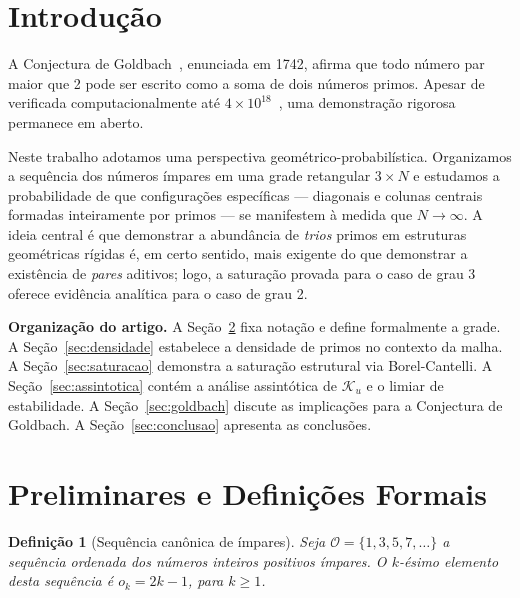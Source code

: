 \documentclass{article}
\newtheorem{definition}[proposition]{Definição}
\begin{document}
	\section{Introdução}
	
	A Conjectura de Goldbach~\cite{goldbach1742}, enunciada em 1742,
	afirma que todo número par maior que 2 pode ser escrito como a
	soma de dois números primos. Apesar de verificada computacionalmente
	até $4 \times 10^{18}$~\cite{oliveira2014}, uma demonstração
	rigorosa permanece em aberto.
	
	Neste trabalho adotamos uma perspectiva geométrico-probabilística.
	Organizamos a sequência dos números ímpares em uma grade retangular
	$3 \times N$ e estudamos a probabilidade de que configurações
	específicas — diagonais e colunas centrais formadas inteiramente
	por primos — se manifestem à medida que $N \to \infty$. A ideia
	central é que demonstrar a abundância de \emph{trios} primos em
	estruturas geométricas rígidas é, em certo sentido, mais exigente
	do que demonstrar a existência de \emph{pares} aditivos; logo, a
	saturação provada para o caso de grau 3 oferece evidência analítica
	para o caso de grau 2.
	
	\medskip
	\noindent\textbf{Organização do artigo.}
	A Seção~\ref{sec:prelim} fixa notação e define formalmente a grade.
	A Seção~\ref{sec:densidade} estabelece a densidade de primos no
	contexto da malha. A Seção~\ref{sec:saturacao} demonstra a saturação
	estrutural via Borel-Cantelli. A Seção~\ref{sec:assintotica} contém
	a análise assintótica de $\mathcal{K}_u$ e o limiar de estabilidade.
	A Seção~\ref{sec:goldbach} discute as implicações para a Conjectura
	de Goldbach. A Seção~\ref{sec:conclusao} apresenta as conclusões.
	
	\section{Preliminares e Definições Formais}
	\label{sec:prelim}
	
	\begin{definition}[Sequência canônica de ímpares]
		Seja $\mathcal{O} = \{1, 3, 5, 7, \ldots\}$ a sequência ordenada
		dos números inteiros positivos ímpares. O $k$-ésimo elemento
		desta sequência é $o_k = 2k - 1$, para $k \geq 1$.
	\end{definition}
	
\end{document}
